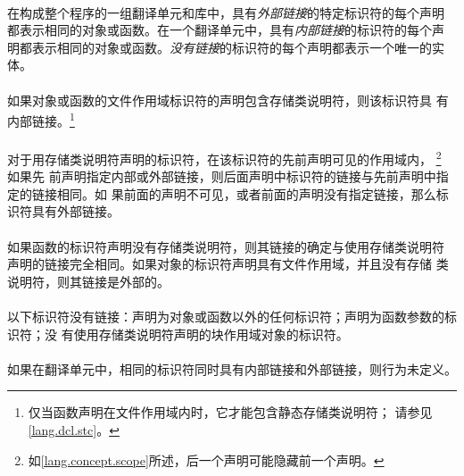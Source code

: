 {\paragraph{}
在构成整个程序的一组翻译单元和库中，具有\textit{外部链接}的特定标识符的每个声明
都表示相同的对象或函数。在一个翻译单元中，具有\textit{内部链接}的标识符的每个声
明都表示相同的对象或函数。\textit{没有链接}的标识符的每个声明都表示一个唯一的实
体。

\paragraph{}
如果对象或函数的文件作用域标识符的声明包含存储类说明符，则该标识符具
有内部链接。\footnote{仅当函数声明在文件作用域内时，它才能包含静态存储类说明符；
请参见\ref{lang.dcl.stc}。}

\paragraph{}
对于用存储类说明符声明的标识符，在该标识符的先前声明可见的作用域内，
\footnote{如\ref{lang.concept.scope}所述，后一个声明可能隐藏前一个声明。} 如果先
前声明指定内部或外部链接，则后面声明中标识符的链接与先前声明中指定的链接相同。如
果前面的声明不可见，或者前面的声明没有指定链接，那么标识符具有外部链接。

\paragraph{}
如果函数的标识符声明没有存储类说明符，则其链接的确定与使用存储类说明符
声明的链接完全相同。如果对象的标识符声明具有文件作用域，并且没有存储
类说明符，则其链接是外部的。

\paragraph{}
以下标识符没有链接：声明为对象或函数以外的任何标识符；声明为函数参数的标识符；没
有使用存储类说明符声明的块作用域对象的标识符。

\paragraph{}
如果在翻译单元中，相同的标识符同时具有内部链接和外部链接，则行为未定义。

}
